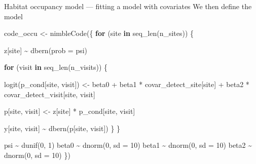\documentclass[
  10pt,
  ignorenonframetext,
  aspectratio=169,
  t]{beamer}
\newenvironment{Shaded}{\begin{snugshade}}{\end{snugshade}}
\newcommand{\AttributeTok}[1]{\textcolor[rgb]{0.40,0.45,0.13}{#1}}
\newcommand{\ControlFlowTok}[1]{\textcolor[rgb]{0.00,0.23,0.31}{\textbf{#1}}}
\newcommand{\DecValTok}[1]{\textcolor[rgb]{0.68,0.00,0.00}{#1}}
\newcommand{\FunctionTok}[1]{\textcolor[rgb]{0.28,0.35,0.67}{#1}}
\newcommand{\NormalTok}[1]{\textcolor[rgb]{0.00,0.23,0.31}{#1}}
\newcommand{\OtherTok}[1]{\textcolor[rgb]{0.00,0.23,0.31}{#1}}
\newcommand{\SpecialCharTok}[1]{\textcolor[rgb]{0.37,0.37,0.37}{#1}}
\begin{document}
\begin{frame}[fragile]{Habitat occupancy model --- fitting a model with
covariates}
\protect{}\label{habitat-occupancy-model-fitting-a-model-with-covariates-1}
We then define the model

\scriptsize

\begin{Shaded}
\begin{Highlighting}[]
\NormalTok{code\_occu }\OtherTok{\textless{}{-}} \FunctionTok{nimbleCode}\NormalTok{(\{}
  \ControlFlowTok{for}\NormalTok{ (site }\ControlFlowTok{in} \FunctionTok{seq\_len}\NormalTok{(n\_sites)) \{}
    
\NormalTok{    z[site] }\SpecialCharTok{\textasciitilde{}} \FunctionTok{dbern}\NormalTok{(}\AttributeTok{prob =}\NormalTok{ psi)}
    
    \ControlFlowTok{for}\NormalTok{ (visit }\ControlFlowTok{in} \FunctionTok{seq\_len}\NormalTok{(n\_visits)) \{}
      
      \FunctionTok{logit}\NormalTok{(p\_cond[site, visit]) }\OtherTok{\textless{}{-}}\NormalTok{ beta0 }\SpecialCharTok{+}
\NormalTok{        beta1 }\SpecialCharTok{*}\NormalTok{ covar\_detect\_site[site] }\SpecialCharTok{+}
\NormalTok{        beta2 }\SpecialCharTok{*}\NormalTok{ covar\_detect\_visit[site, visit]}
      
\NormalTok{      p[site, visit] }\OtherTok{\textless{}{-}}\NormalTok{ z[site] }\SpecialCharTok{*}\NormalTok{ p\_cond[site, visit]}
      
\NormalTok{      y[site, visit] }\SpecialCharTok{\textasciitilde{}} \FunctionTok{dbern}\NormalTok{(p[site, visit])}
\NormalTok{    \}}
\NormalTok{  \}}
  
\NormalTok{  psi }\SpecialCharTok{\textasciitilde{}} \FunctionTok{dunif}\NormalTok{(}\DecValTok{0}\NormalTok{, }\DecValTok{1}\NormalTok{)}
\NormalTok{  beta0 }\SpecialCharTok{\textasciitilde{}} \FunctionTok{dnorm}\NormalTok{(}\DecValTok{0}\NormalTok{, }\AttributeTok{sd =} \DecValTok{10}\NormalTok{)}
\NormalTok{  beta1 }\SpecialCharTok{\textasciitilde{}} \FunctionTok{dnorm}\NormalTok{(}\DecValTok{0}\NormalTok{, }\AttributeTok{sd =} \DecValTok{10}\NormalTok{)}
\NormalTok{  beta2 }\SpecialCharTok{\textasciitilde{}} \FunctionTok{dnorm}\NormalTok{(}\DecValTok{0}\NormalTok{, }\AttributeTok{sd =} \DecValTok{10}\NormalTok{)}
\NormalTok{\})}
\end{Highlighting}
\end{Shaded}

\normalsize
\end{frame}
\end{document}
